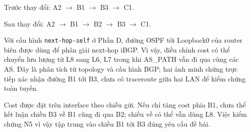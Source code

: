 \begin{center}
Trước thay đổi: A2 $\rightarrow$ B1 $\rightarrow$ B3 $\rightarrow$ C1.

Sau thay đổi: A2 $\rightarrow$ B1 $\rightarrow$ B2
$\rightarrow$ B3 $\rightarrow$ C1.
\end{center}

Với cấu hình \texttt{next-hop-self} ở Phần D,
đường OSPF tới Loopback0 của router biên được dùng
để phân giải next-hop iBGP. Vì vậy, điều chỉnh cost
có thể chuyển lưu lượng từ L8 sang L6, L7 trong khi
AS\_PATH vẫn đi qua cùng các AS.
Đây là phân tích từ topology và cấu hình BGP;
hai ảnh minh chứng trực tiếp xác nhận đường B1 tới B3,
chưa có traceroute giữa hai LAN để kiểm chứng toàn tuyến.

Cost được đặt trên interface theo chiều gửi.
Nếu chỉ tăng cost phía B1, chưa thể kết luận
chiều B3 về B1 cũng đi qua B2; chiều về có thể vẫn dùng L8.
Việc kiểm chứng N5 vì vậy tập trung vào chiều
B1 tới B3 đúng yêu cầu đề bài.

\newpage
